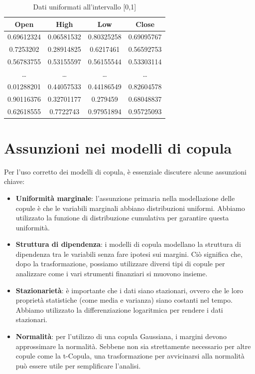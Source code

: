 \documentclass[%
	corpo=11pt,
    twoside,
    stile=classica,
    oldstyle,
    tipotesi=custom,
    greek,
    evenboxes,
]{toptesi}
\begin{document}
\begin{table}[h]
	\centering
	\renewcommand{\arraystretch}{1.2} %
	\setlength{\tabcolsep}{6pt} %
	\small %
	\begin{tabular}{cccc} %
		\toprule
		\textbf{Open} & \textbf{High} & \textbf{Low} & \textbf{Close} \\
		\midrule
		0.69612324 & 0.06581532 & 0.80325258 & 0.69095767 \\
		0.7253202  & 0.28914825 & 0.6217461  & 0.56592753 \\
		0.56783755 & 0.53155597 & 0.56155544 & 0.53303114 \\
		\midrule
		\dots & \dots & \dots & \dots \\
		\midrule
		0.01288201 & 0.44057533 & 0.44186549 & 0.82604578 \\
		0.90116376 & 0.32701177 & 0.279459   & 0.68048837 \\
		0.62618555 & 0.7722743  & 0.97951894 & 0.95725093 \\
		\bottomrule
	\end{tabular}
	\caption{Dati uniformati all'intervallo [0,1]}
	\label{tab:dati_array}
\end{table}

\section{Assunzioni nei modelli di copula}

Per l’uso corretto dei modelli di copula, è essenziale discutere alcune assunzioni chiave:

\begin{itemize}
	\item \textbf{Uniformità marginale}: l’assunzione primaria nella modellazione delle copule è che le variabili marginali abbiano distribuzioni uniformi. Abbiamo utilizzato la funzione di distribuzione cumulativa per garantire questa uniformità.
	
	\item \textbf{Struttura di dipendenza}: i modelli di copula modellano la struttura di dipendenza tra le variabili senza fare ipotesi sui margini. Ciò significa che, dopo la trasformazione, possiamo utilizzare diversi tipi di copule per analizzare come i vari strumenti finanziari si muovono insieme.
	
	\item \textbf{Stazionarietà}: è importante che i dati siano stazionari, ovvero che le loro proprietà statistiche (come media e varianza) siano costanti nel tempo. Abbiamo utilizzato la differenziazione logaritmica per rendere i dati stazionari.
	
	\item \textbf{Normalità}: per l’utilizzo di una copula Gaussiana, i margini devono approssimare la normalità. Sebbene non sia strettamente necessario per altre copule come la t-Copula, una trasformazione per avvicinarsi alla normalità può essere utile per semplificare l’analisi.
\end{itemize}
\end{document}
